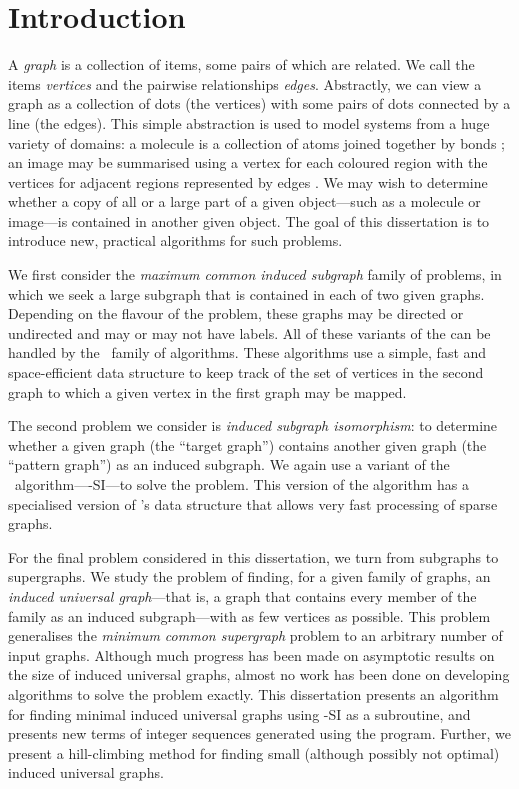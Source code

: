 \chapter{Introduction}
\label{c:intro}

\newcommand{\ChapterRef}[1] {\Cref{#1}: \nameref{#1}}

A \emph{graph} is a collection of items, some pairs of which are related.  We
call the items \emph{vertices} and the pairwise relationships \emph{edges}.
Abstractly, we can view a graph as a collection of dots (the vertices) with
some pairs of dots connected by a line (the edges).  This simple abstraction
is used to model systems from a huge variety of domains: a molecule is a
collection of atoms joined together by bonds \citep{sussenguth1965graph}; an
image may be summarised using a vertex for each coloured region with the
vertices for adjacent regions represented by edges
\citep{DBLP:conf/icip/OlatunbosunDE96}.  We may wish to determine whether a
copy of all
or a large part of a given object---such as a molecule or image---is contained
in another given object.  The goal of this dissertation is to introduce new,
practical algorithms for such problems.

We first consider the \emph{maximum common induced subgraph} family of
problems, in which we seek a large subgraph that is contained in each of two
given graphs.  Depending on the flavour of the problem, these graphs may be
directed or undirected and may or may not have labels.  All of these variants
of the can be handled by the \McSplit\ family of algorithms.  These algorithms
use a simple, fast and space-efficient data structure to keep track of the set
of vertices in the second graph to which a given vertex in the first graph may
be mapped.

The second problem we consider is \emph{induced subgraph isomorphism}: to
determine whether a given graph (the ``target graph'') contains another given
graph (the ``pattern graph'') as an induced subgraph.  We again use a variant
of the \McSplit\ algorithm---\McSplit-SI---to solve the problem. This version
of the algorithm has a specialised version of \McSplit's data structure that
allows very fast processing of sparse graphs.

For the final problem considered in this dissertation, we turn from subgraphs
to supergraphs.  We study the problem of finding, for a given family of graphs,
an \textit{induced universal graph}---that is, a graph that contains every
member of the family as an induced subgraph---with as few vertices as
possible.  This problem generalises the \textit{minimum common supergraph}
problem to an arbitrary number of input graphs.  Although much progress has
been made on asymptotic results on the size of induced universal graphs, almost no
work has been done on developing algorithms to solve the problem exactly.  This
dissertation presents an algorithm for finding minimal induced universal graphs
using \McSplit-SI as a subroutine, and presents new terms of integer sequences
generated using the program.  Further, we present a hill-climbing method for
finding small (although possibly not optimal) induced universal graphs.


